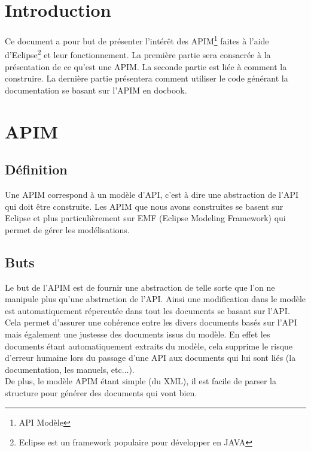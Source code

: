 \documentclass{article}
\begin{document}
\tableofcontents


\section*{Introduction}
Ce document a pour but de pr\'esenter l'int\'er\^et des APIM\footnote{API Mod\`ele} faites \`a l'aide d'Eclipse\footnote{Eclipse est un framework populaire pour d\'evelopper en JAVA} et leur fonctionnement. La premi\`ere partie sera consacr\'ee \`a la pr\'esentation de ce qu'est une APIM. La seconde partie est li\'ee \`a comment la construire. La derni\`ere partie pr\'esentera comment utiliser le code g\'en\'erant la documentation se basant sur l'APIM en docbook.


\section*{APIM}
\subsection*{D\'efinition}
Une APIM correspond \`a un mod\`ele d'API, c'est \`a dire une abstraction de l'API qui doit \^etre construite. Les APIM que nous avons construites se basent sur Eclipse et plus particuli\`erement sur EMF (Eclipse Modeling Framework) qui permet de g\'erer les mod\'elisations.
\subsection*{Buts}
Le but de l'APIM est de fournir une abstraction de telle sorte que l'on ne manipule plus qu'une abstraction de l'API. Ainsi une modification dans le mod\`ele est automatiquement r\'epercut\'ee dans tout les documents se basant sur l'API. Cela permet d'assurer une coh\'erence entre les divers documents bas\'es sur l'API mais \'egalement une justesse des documents issus du mod\`ele. En effet les documents \'etant automatiquement extraits du mod\`ele, cela supprime le risque d'erreur humaine lors du passage d'une API aux documents qui lui sont li\'es (la documentation, les manuels, etc...). \\
De plus, le mod\`ele APIM \'etant simple (du XML), il est facile de parser la structure pour g\'en\'erer des documents qui vont bien.
\end{document}
